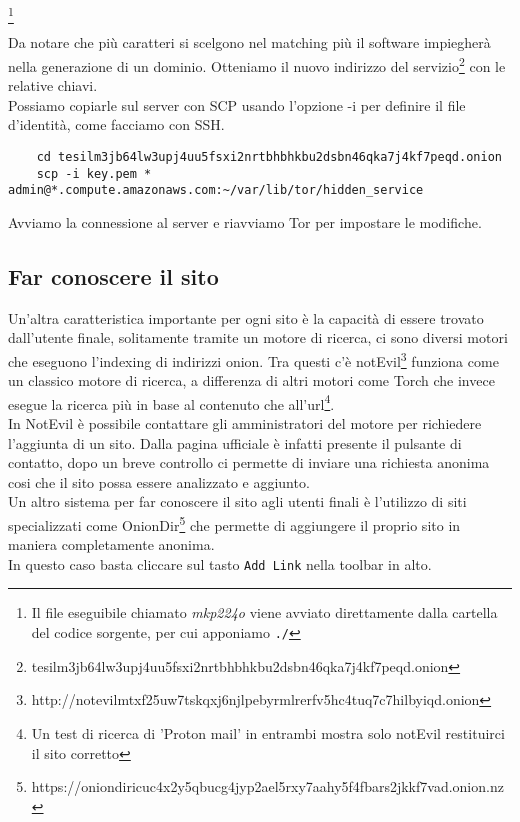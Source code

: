 \footnote{Il file eseguibile chiamato \emph{mkp224o} viene avviato direttamente dalla cartella del codice sorgente, per cui apponiamo \lstinline{./}}

Da notare che più caratteri si scelgono nel matching più il software impiegherà nella generazione di un dominio. 
Otteniamo il nuovo indirizzo del servizio\footnote{tesilm3jb64lw3upj4uu5fsxi2nrtbhbhkbu2dsbn46qka7j4kf7peqd.onion} con le relative chiavi. \\
Possiamo copiarle sul server con SCP usando l'opzione -i per definire il file d'identità, come facciamo con SSH.

\begin{lstlisting}
    cd tesilm3jb64lw3upj4uu5fsxi2nrtbhbhkbu2dsbn46qka7j4kf7peqd.onion
    scp -i key.pem * admin@*.compute.amazonaws.com:~/var/lib/tor/hidden_service
\end{lstlisting}

Avviamo la connessione al server e riavviamo Tor per impostare le modifiche.


\newpage

\subsection{Far conoscere il sito}
Un'altra caratteristica importante per ogni sito è la capacità di essere trovato dall'utente finale, solitamente tramite un motore di ricerca, ci sono diversi motori che eseguono l'indexing di indirizzi onion. Tra questi c'è notEvil\footnote{http://notevilmtxf25uw7tskqxj6njlpebyrmlrerfv5hc4tuq7c7hilbyiqd.onion} funziona come un classico motore di ricerca, a differenza di altri motori come Torch che invece esegue la ricerca più in base al contenuto che all'url\footnote{Un test di ricerca di 'Proton mail' in entrambi mostra solo notEvil restituirci il sito corretto}. \\
In NotEvil è possibile contattare gli amministratori del motore per richiedere l'aggiunta di un sito. 
Dalla pagina ufficiale è infatti presente il pulsante di contatto, dopo un breve controllo ci permette di inviare una richiesta anonima cosi che il sito possa essere analizzato e aggiunto. \\
Un altro sistema per far conoscere il sito agli utenti finali è l'utilizzo di siti specializzati come OnionDir\footnote{https://oniondiricuc4x2y5qbucg4jyp2ael5rxy7aahy5f4fbars2jkkf7vad.onion.nz} che permette di aggiungere il proprio sito in maniera completamente anonima. \\
In questo caso basta cliccare sul tasto \lstinline{Add Link} nella toolbar in alto. 

